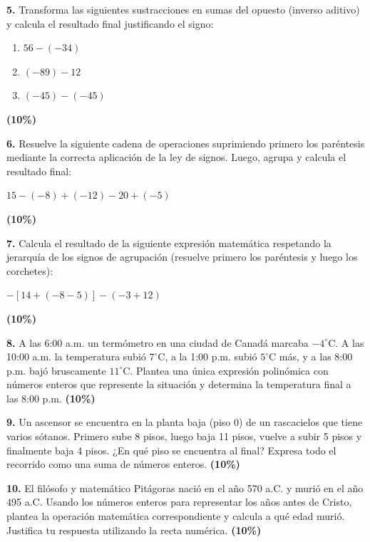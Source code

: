 \documentclass[11pt, letterpaper]{article}
\begin{document}
	\vspace{0.4cm}
	
	\noindent \textbf{5.} Transforma las siguientes sustracciones en sumas del opuesto (inverso aditivo) y calcula el resultado final justificando el signo:
	\begin{enumerate}[label=\alph*), itemsep=0.1cm]
		\item $56 - (-34)$
		\item $(-89) - 12$
		\item $(-45) - (-45)$
	\end{enumerate}
	\hfill \textbf{(10\%)}
	
	\vspace{0.4cm}
	
	\noindent \textbf{6.} Resuelve la siguiente cadena de operaciones suprimiendo primero los paréntesis mediante la correcta aplicación de la ley de signos. Luego, agrupa y calcula el resultado final:
	\begin{center}
		$ 15 - (-8) + (-12) - 20 + (-5) $
	\end{center}
	\hfill \textbf{(10\%)}
	
	\vspace{0.4cm}
	
	\noindent \textbf{7.} Calcula el resultado de la siguiente expresión matemática respetando la jerarquía de los signos de agrupación (resuelve primero los paréntesis y luego los corchetes):
	\begin{center}
		$ - [ 14 + (-8 - 5) ] - ( -3 + 12 ) $
	\end{center}
	\hfill \textbf{(10\%)}
	
	\vspace{0.4cm}
	
	\noindent \textbf{8.} A las 6:00 a.m. un termómetro en una ciudad de Canadá marcaba $ -4^\circ\text{C} $. A las 10:00 a.m. la temperatura subió $ 7^\circ\text{C} $, a la 1:00 p.m. subió $ 5^\circ\text{C} $ más, y a las 8:00 p.m. bajó bruscamente $ 11^\circ\text{C} $. Plantea una única expresión polinómica con números enteros que represente la situación y determina la temperatura final a las 8:00 p.m.
	\hfill \textbf{(10\%)}
	
	\vspace{0.4cm}
	
	\noindent \textbf{9.} Un ascensor se encuentra en la planta baja (piso 0) de un rascacielos que tiene varios sótanos. Primero sube 8 pisos, luego baja 11 pisos, vuelve a subir 5 pisos y finalmente baja 4 pisos. ¿En qué piso se encuentra al final? Expresa todo el recorrido como una suma de números enteros.
	\hfill \textbf{(10\%)}
	
	\vspace{0.4cm}
	
	\noindent \textbf{10.} El filósofo y matemático Pitágoras nació en el año 570 a.C. y murió en el año 495 a.C. Usando los números enteros para representar los años antes de Cristo, plantea la operación matemática correspondiente y calcula a qué edad murió. Justifica tu respuesta utilizando la recta numérica.
	\hfill \textbf{(10\%)}
	
\end{document}

